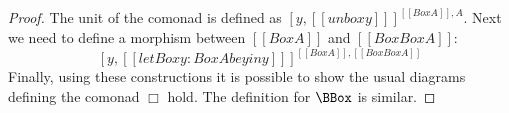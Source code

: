 \begin{proof}
  The unit of the comonad is defined as $[ y,[[unbox y]] ]^{[[Box
        A]],A}$.  Next we need to define a morphism between $[[Box
      A]]$ and $[[Box Box A]]$:
  \[
  [y,[[letBox y : Box A be y in y]] ]^{[[Box A]],[[Box Box A]]}
  \]
  Finally, using these constructions it is possible to show the usual
  diagrams defining the comonad $\Box$ hold.  The definition for
  $\BBox$ is similar.
\end{proof}
